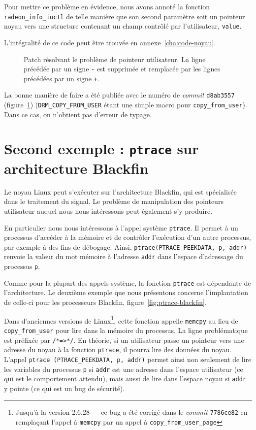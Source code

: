 Pour mettre ce problème en évidence, nous avons annoté la fonction
\texttt{radeon\_info\_ioctl} de telle manière que son second paramètre soit un
pointeur noyau vers une structure contenant un champ contrôlé par l'utilisateur,
\texttt{value}.

L'intégralité de ce code peut être trouvée en annexe~\ref{cha:code-noyau}.

\begin{figure}

  \caption[Patch résolvant le problème de pointeur utilisateur.]
      {Patch résolvant le problème de pointeur utilisateur.
       La ligne précédée par un signe \texttt{-} est supprimée et remplacée
       par les lignes précédées par un signe \texttt{+}.
      }
\label{fig:linux-patch}
\end{figure}

La bonne manière de faire a été publiée avec le numéro de \emph{commit}
\texttt{d8ab3557} (figure~\ref{fig:linux-patch}) (\texttt{DRM\_COPY\_FROM\_USER}
étant une simple macro pour \texttt{copy\_from\_user}). Dans ce cas, on
n'obtient pas d'erreur de typage.

\section{Second exemple : \texttt{ptrace} sur architecture Blackfin}

Le noyau Linux peut s'exécuter sur l'architecture Blackfin, qui est spécialisée
dans le traitement du signal. Le problème de manipulation des pointeurs
utilisateur auquel nous nous intéressons peut également s'y produire.

En particulier nous nous intéressons à l'appel système \texttt{ptrace}. Il
permet à un processus d'accéder à la mémoire et de contrôler l'exécution d'un
autre processus, par exemple à des fins de débogage. Ainsi,
\texttt{ptrace(PTRACE\_PEEKDATA, p, addr)} renvoie la valeur du mot mémoire à
l'adresse \texttt{addr} dans l'espace d'adressage du processus \texttt{p}.

Comme pour la plupart des appels système, la fonction \texttt{ptrace} est
dépendante de l'architecture. Le deuxième exemple que nous présentons concerne
l'implantation de celle-ci pour les processeurs Blackfin,
figure~\ref{fig:ptrace-blackfin}.

Dans d'anciennes versions de Linux\footnote{Jusqu'à la version 2.6.28 --- ce bug
a été corrigé dans le \emph{commit} \texttt{7786ce82} en remplaçant l'appel à
\texttt{memcpy} par un appel à \texttt{copy\_from\_user\_page}}, cette fonction
appelle \texttt{memcpy} au lieu de \nolinkurl{copy\_from\_user} pour lire dans
la mémoire du processus. La ligne problématique est préfixée par
\texttt{/*=\textgreater{}*/}. En théorie, si un utilisateur passe un pointeur
vers une adresse du noyau à la fonction \texttt{ptrace}, il pourra lire des
données du noyau. L'appel \texttt{ptrace (PTRACE\_PEEKDATA, p, addr)} permet
ainsi non seulement de lire les variables du processus \texttt{p} si
\texttt{addr} est une adresse dans l'espace utilisateur (ce qui est le
comportement attendu), mais aussi de lire dans l'espace noyau si \texttt{addr} y
pointe (ce qui est un bug de sécurité).

